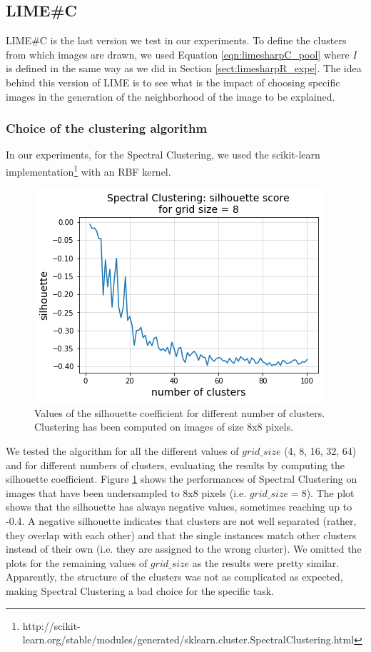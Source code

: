 \documentclass[12pt, twoside, a4paper]{report}
\begin{document}
\subsection{LIME\#C}

LIME\#C is the last version we test in our experiments. To define the clusters from which images are drawn, we used Equation \ref{eqn:limesharpC_pool} where $I$ is defined in the same way as we did in Section \ref{sect:limesharpR_expe}. The idea behind this version of LIME is to see what is the impact of choosing specific images in the generation of the neighborhood of the image to be explained.

\subsubsection{Choice of the clustering algorithm}

In our experiments, for the Spectral Clustering, we used the scikit-learn implementation\footnote{http://scikit-learn.org/stable/modules/generated/sklearn.cluster.SpectralClustering.html} with an RBF kernel.

\begin{figure}
\centering
\includegraphics[width=.8\linewidth]{images/spectral_silhouette.png}
\caption{Values of the silhouette coefficient for different number of clusters. Clustering has been computed on images of size 8x8 pixels.}
\label{fig:spectral-silhouette}
\end{figure}

We tested the algorithm for all the different values of $grid\_size$ (4, 8, 16, 32, 64) and for different numbers of clusters, evaluating the results by computing the silhouette coefficient. Figure \ref{fig:spectral-silhouette} shows the performances of Spectral Clustering on images that have been undersampled to 8x8 pixels (i.e. $grid\_size = 8$). The plot shows that the silhouette has always negative values, sometimes reaching up to -0.4. A negative silhouette indicates that clusters are not well separated (rather, they overlap with each other) and that the single instances match other clusters instead of their own (i.e. they are assigned to the wrong cluster). We omitted the plots for the remaining values of $grid\_size$ as the results were pretty similar. Apparently, the structure of the clusters was not as complicated as expected, making Spectral Clustering a bad choice for the specific task. 
\end{document}
